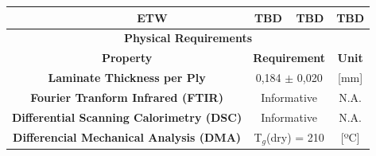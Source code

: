\begin{table}[htbp]
{\begin{tabular}{@{}ccccc@{}}
\multicolumn{1}{c|}{}                                                        & \multicolumn{1}{c|}{ETW}                                                                    & \multicolumn{1}{c|}{TBD}                   & \multicolumn{1}{c|}{TBD}                      & TBD                                                     \\ \midrule
\multicolumn{5}{c}{\textbf{Physical Requirements}}                                                                                                                                                                                                                                                                                \\ \midrule
\multicolumn{2}{c|}{\textbf{Property}}                                                                                                                                     & \multicolumn{2}{c|}{\textbf{Requirement}}                                                  & \textbf{Unit}                                           \\ \midrule
\multicolumn{2}{c|}{\textbf{Laminate Thickness per Ply}}                                                                                                                   & \multicolumn{2}{c|}{0,184 $\pm$ 0,020}                                                     & {[}mm{]}                                                \\ \midrule
\multicolumn{2}{c|}{\textbf{Fourier Tranform Infrared (FTIR)}}                                                                                                             & \multicolumn{2}{c|}{Informative}                                                           & N.A.                                                    \\ \midrule
\multicolumn{2}{c|}{\textbf{Differential Scanning Calorimetry (DSC)}}                                                                                                      & \multicolumn{2}{c|}{Informative}                                                           & N.A.                                                    \\ \midrule
\multicolumn{2}{c}{\textbf{Differencial Mechanical Analysis (DMA)}}                                                                                                        & \multicolumn{2}{c}{T$_g$(dry)  = 210}                                                      & {[}ºC{]}                                                \\ \bottomrule
\end{tabular}
}
\end{table}

